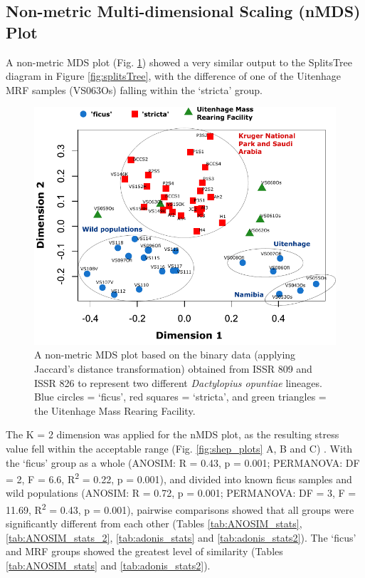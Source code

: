 \subsection{Non-metric Multi-dimensional Scaling (nMDS) Plot}
A non-metric MDS plot (Fig. \ref{fig:2D_scatter}) showed a very similar output to the SplitsTree diagram in Figure \ref{fig:splitsTree}, with the difference of one of the Uitenhage MRF samples (VS063Os) falling within the `stricta' group. 

\vspace{0.5cm}

\begin{figure}[H]
	\centering
	\includegraphics[scale =1.25]{Images/2d_nmds_3.pdf}
	\caption{A non-metric MDS plot based on the binary data (applying Jaccard's distance transformation) obtained from ISSR 809 and ISSR 826 to represent two different \textit{Dactylopius opuntiae} lineages. Blue circles = `ficus', red squares = `stricta', and green triangles = the Uitenhage Mass Rearing Facility.} 
	\label{fig:2D_scatter}
\end{figure}

\noindent The K = 2 dimension was applied for the nMDS plot, as the resulting stress value fell within the acceptable range (Fig. \ref{fig:shep_plots} A, B and C) \citep{dugard2010stats}. 
With the `ficus' group as a whole (ANOSIM: R = 0.43, p = 0.001; PERMANOVA: DF = 2, F = 6.6, R\textsuperscript{2} = 0.22, p = 0.001), and divided into known ficus samples and wild populations (ANOSIM: R = 0.72, p = 0.001; PERMANOVA: DF = 3, F = 11.69, R\textsuperscript{2} = 0.43, p = 0.001), pairwise comparisons showed that all groups were significantly different from each other (Tables \ref{tab:ANOSIM_stats}, \ref{tab:ANOSIM_stats_2}, \ref{tab:adonis_stats} and \ref{tab:adonis_stats2}). The `ficus' and MRF groups showed the greatest level of similarity (Tables \ref{tab:ANOSIM_stats} and \ref{tab:adonis_stats2}).

